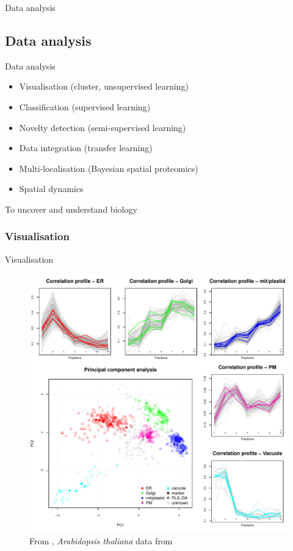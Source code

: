 \begin{frame}{}
  \begin{center}
    \Large{Data analysis}
  \end{center}
\end{frame}


\subsection*{Data analysis}
\label{sec:comp}


\begin{frame}{Data analysis}
  \begin{itemize}
  \item Visualisation (cluster, unsupervised learning)
  \item Classification (supervised learning)
  \item Novelty detection (semi-supervised learning)
  \item Data integration (transfer learning)
  \item Multi-localisation (Bayesian spatial proteomics)
  \item Spatial dynamics
  \end{itemize}
  \centering
  {\Large To uncover and understand biology}
\end{frame}



\subsubsection*{Visualisation}
\label{sec:viz}

\begin{frame}{Visualisation}
  \begin{figure}
    \centering
    \includegraphics[width=.6\linewidth]{figs_all/F04-analyses.pdf}
    \caption{From \cite{Gatto:2010}, \textit{Arabidopsis thaliana} data
      from \cite{Dunkley:2006}}
  \end{figure}
\end{frame}

